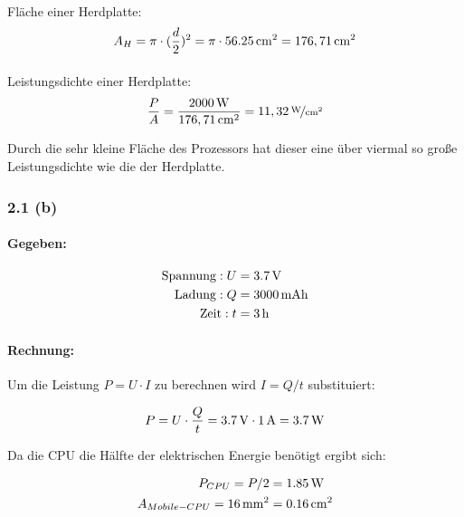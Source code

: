 \documentclass[11pt,a4paper]{article}
\begin{document}
\paragraph{}Fläche einer Herdplatte:
\begin{equation*}
A_H = \pi\cdot(\frac{d}{2})^2 =  \pi\cdot\unit[56.25]{cm^2} = \unit[176,71]{cm^2}
\end{equation*}

\paragraph{}Leistungsdichte einer Herdplatte:
\begin{equation*}
\frac{P}{A} = \frac{\unit[2000]{W}}{\unit[176,71]{cm^2}} = \unitfrac[11,32]{W}{cm^2}
\end{equation*}

Durch die sehr kleine Fläche des Prozessors hat dieser eine über viermal so große Leistungsdichte wie die der Herdplatte.

\newpage
\subsubsection{2.1 (b)}
\paragraph{Gegeben:}
\begin{align*}
\mbox{Spannung}: U &= \unit[3.7]{V}\\
\mbox{Ladung}: Q &= \unit[3000]{mAh}\\
\mbox{Zeit}: t &= \unit[3]{h}
\end{align*}

\paragraph{Rechnung:}
Um die Leistung $P = U \cdot I$ zu berechnen wird $I = Q/t$ substituiert:

\begin{equation*}
P = U\cdot\frac{Q}{t} = \unit[3.7]{V} \cdot \unit[1]{A} = \unit[3.7]{W}
\end{equation*}

Da die CPU die Hälfte der elektrischen Energie benötigt ergibt sich:

\begin{align*}
P_{CPU} = P/2 &= \unit[1.85]{W}\\
A_{Mobile-CPU} = \unit[16]{mm^2} &= \unit[0.16]{cm^2}
\end{align*}
\end{document}
